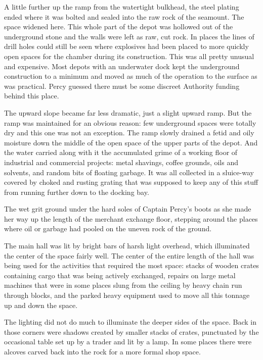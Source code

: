 \documentclass[
]{scrbook}
\begin{document}
A little further up the ramp from the watertight bulkhead, the steel
plating ended where it was bolted and sealed into the raw rock of the
seamount. The space widened here. This whole part of the depot was
hollowed out of the underground stone and the walls were left as raw,
cut rock. In places the lines of drill holes could still be seen where
explosives had been placed to more quickly open spaces for the chamber
during its construction. This was all pretty unusual and expensive. Most
depots with an underwater dock kept the underground construction to a
minimum and moved as much of the operation to the surface as was
practical. Percy guessed there must be some discreet Authority funding
behind this place.

The upward slope became far less dramatic, just a slight upward ramp.
But the ramp was maintained for an obvious reason: few underground
spaces were totally dry and this one was not an exception. The ramp
slowly drained a fetid and oily moisture down the middle of the open
space of the upper parts of the depot. And the water carried along with
it the accumulated grime of a working floor of industrial and commercial
projects: metal shavings, coffee grounds, oils and solvents, and random
bits of floating garbage. It was all collected in a sluice-way covered
by choked and rusting grating that was supposed to keep any of this
stuff from running further down to the docking bay.

The wet grit ground under the hard soles of Captain Percy's boots as she
made her way up the length of the merchant exchange floor, stepping
around the places where oil or garbage had pooled on the uneven rock of
the ground.

The main hall was lit by bright bars of harsh light overhead, which
illuminated the center of the space fairly well. The center of the
entire length of the hall was being used for the activities that
required the most space: stacks of wooden crates containing cargo that
was being actively exchanged, repairs on large metal machines that were
in some places slung from the ceiling by heavy chain run through blocks,
and the parked heavy equipment used to move all this tonnage up and down
the space.

The lighting did not do much to illuminate the deeper sides of the
space. Back in those corners were shadows created by smaller stacks of
crates, punctuated by the occasional table set up by a trader and lit by
a lamp. In some places there were alcoves carved back into the rock for
a more formal shop space.
\end{document}
